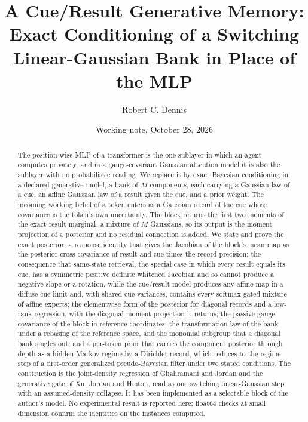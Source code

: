 \documentclass[11pt]{article}
\title{A Cue/Result Generative Memory:\\Exact Conditioning of a Switching Linear-Gaussian Bank in Place of the MLP}
\author{Robert C. Dennis}
\date{Working note, October 28, 2026}
\theoremstyle{definition}
\theoremstyle{remark}
\begin{document}
\maketitle

\begin{abstract}
The position-wise MLP of a transformer is the one sublayer in which an agent computes privately, and in a gauge-covariant Gaussian attention model it is also the sublayer with no probabilistic reading. We replace it by exact Bayesian conditioning in a declared generative model, a bank of $M$ components, each carrying a Gaussian law of a cue, an affine Gaussian law of a result given the cue, and a prior weight. The incoming working belief of a token enters as a Gaussian record of the cue whose covariance is the token's own uncertainty. The block returns the first two moments of the exact result marginal, a mixture of $M$ Gaussians, so its output is the moment projection of a posterior and no residual connection is added. We state and prove the exact posterior; a response identity that gives the Jacobian of the block's mean map as the posterior cross-covariance of result and cue times the record precision; the consequence that same-state retrieval, the special case in which every result equals its cue, has a symmetric positive definite whitened Jacobian and so cannot produce a negative slope or a rotation, while the cue/result model produces any affine map in a diffuse-cue limit and, with shared cue variances, contains every softmax-gated mixture of affine experts; the elementwise form of the posterior for diagonal records and a low-rank regression, with the diagonal moment projection it returns; the passive gauge covariance of the block in reference coordinates, the transformation law of the bank under a rebasing of the reference space, and the monomial subgroup that a diagonal bank singles out; and a per-token prior that carries the component posterior through depth as a hidden Markov regime by a Dirichlet record, which reduces to the regime step of a first-order generalized pseudo-Bayesian filter under two stated conditions. The construction is the joint-density regression of Ghahramani and Jordan and the generative gate of Xu, Jordan and Hinton, read as one switching linear-Gaussian step with an assumed-density collapse. It has been implemented as a selectable block of the author's model. No experimental result is reported here; float64 checks at small dimension confirm the identities on the instances computed.
\end{abstract}
\end{document}
